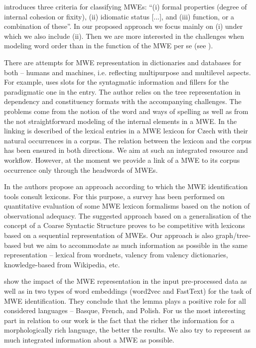 \documentclass[output=paper,colorlinks,citecolor=brown]{langscibook}
\begin{document}
\citet{MultiWordExpressionsandMorphology} introduces three criteria for classifying MWEs: “(i) formal properties (degree of internal cohesion or fixity), (ii) idiomatic status [...], and (iii) function, or a combination of these”. In our proposed approach we focus mainly on (i) under which we also include (ii). Then we are more interested in the challenges when modeling word order than in the function of the MWE per se (see ).\largerpage

There are attempts for MWE representation in dictionaries and data\-bases for both -- humans and machines, i.e. reflecting multipurpose and multilevel aspects. For example, \citet{vondricka:2019} uses slots for the syntagmatic information and fillers for the paradigmatic one in the entry. The author relies on the tree representation in dependency and constituency formats with the accompanying challenges. The problems come from the notion of the word and ways of spelling as well as from the not straightforward modeling of the internal elements in a MWE. In  the linking is described of the lexical entries in a MWE lexicon for Czech with their natural occurrences in a corpus. The relation between the lexicon and the corpus has been ensured in both directions. We aim at such an integrated resource and workflow. However, at the moment we provide a link of a MWE to its corpus occurrence only through the headwords of MWEs. 

In \citet{lion-bouton-etal-2023-mwe} the authors propose an approach according to which the MWE identification tools consult lexicons. For this purpose, a survey has been performed on quantitative evaluation of some MWE
lexicon formalisms based on the notion of observational
adequacy. The suggested approach based on a generalisation of the concept of a Coarse Syntactic Structure proves to be competitive with lexicons based on a sequential representation of MWEs. Our approach is also graph/tree-based but we aim to accommodate as much information as possible in the same representation -- lexical from wordnets, valency from valency dictionaries, knowledge-based from Wikipedia, etc.

\citet{zampieri-etal-2019-impact} show the impact of the MWE representation in the input pre-processed data as well as in two types of word embeddings (word2vec and FastText) for the task of MWE identification. They conclude that the lemma plays a positive role for all considered languages -- Basque, French, and Polish. For us the most interesting part in relation to our work is the fact that the richer the information for a morphologically rich language, the better the results. We also try to represent as much integrated information about a MWE as possible.   
\end{document}
